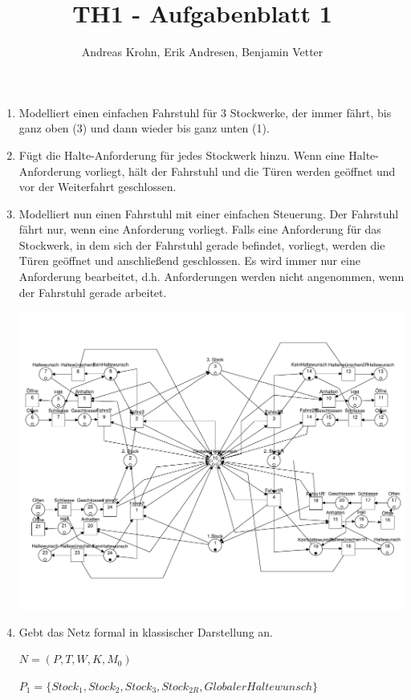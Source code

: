 \documentclass{scrreprt}
\title{TH1 - Aufgabenblatt 1}
\author{Andreas Krohn, Erik Andresen, Benjamin Vetter}
\begin{document}
\maketitle

\begin{enumerate}
\item Modelliert einen einfachen Fahrstuhl für 3 Stockwerke, der immer fährt, bis ganz oben (3) und dann wieder bis ganz unten (1).

\item Fügt die Halte-Anforderung für jedes Stockwerk hinzu. Wenn eine Halte-Anforderung vorliegt, hält der Fahrstuhl und die Türen werden geöffnet und vor der Weiterfahrt geschlossen.

\item Modelliert nun einen Fahrstuhl mit einer einfachen Steuerung. Der Fahrstuhl fährt nur, wenn eine Anforderung vorliegt. Falls eine Anforderung für das Stockwerk, in dem sich der Fahrstuhl gerade befindet, vorliegt, werden die Türen geöffnet und anschließend geschlossen. Es wird immer nur eine Anforderung bearbeitet, d.h. Anforderungen werden nicht angenommen, wenn der Fahrstuhl gerade arbeitet.

\includegraphics[width=1\textwidth]{prak_aufg3_fertig_bugfix2.pdf}

\item Gebt das Netz formal in klassischer Darstellung an.

$N = (P, T, W, K, M_0)$

$P_1 = \{ Stock_1, Stock_2, Stock_3, Stock_{2R}, GlobalerHaltewunsch \}$


\end{enumerate}
\end{document}
